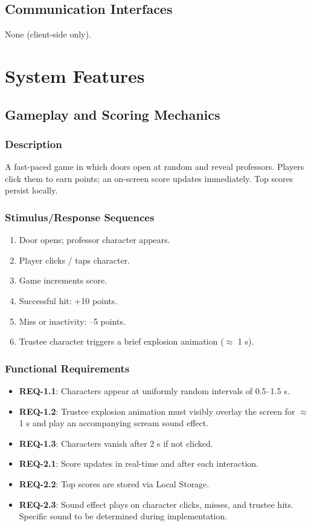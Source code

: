\documentclass[11pt]{scrreprt}
\begin{document}
\section{Communication Interfaces}
None (client-side only).

\chapter{System Features}

\section{Gameplay and Scoring Mechanics}

\subsection{Description}
A fast-paced game in which doors open at random and reveal professors. Players click them to earn points; an on-screen score updates immediately. Top scores persist locally.

\subsection{Stimulus/Response Sequences}
\begin{enumerate}
  \item Door opens; professor character appears.
  \item Player clicks / taps character.
  \item Game increments score.
  \item Successful hit: +10 points.
  \item Miss or inactivity: –5 points.
  \item Trustee character triggers a brief explosion animation ($\approx$ 1 s).
\end{enumerate}

\subsection{Functional Requirements}
\begin{itemize}
  \item \textbf{REQ-1.1}: Characters appear at uniformly random intervals of 0.5–1.5 s.
  \item \textbf{REQ-1.2}: Trustee explosion animation must visibly overlay the screen for $\approx$ 1 s and play an accompanying scream sound effect.
  \item \textbf{REQ-1.3}: Characters vanish after 2 s if not clicked.
  \item \textbf{REQ-2.1}: Score updates in real-time and after each interaction.
  \item \textbf{REQ-2.2}: Top scores are stored via Local Storage.
  \item \textbf{REQ-2.3}: Sound effect plays on character clicks, misses, and trustee hits. Specific sound to be determined during implementation.
\end{itemize}
\end{document}
